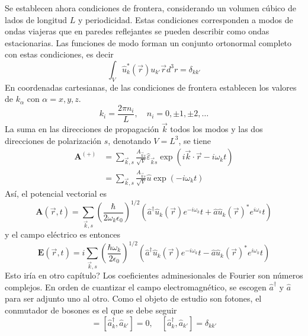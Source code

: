   Se establecen ahora condiciones de frontera, considerando un volumen cúbico de lados de longitud $L$ y periodicidad. Estas condiciones corresponden a modos de ondas viajeras que en paredes reflejantes se pueden describir como ondas estacionarias. Las funciones de modo forman un conjunto ortonormal completo con estas condiciones, es decir
  \begin{equation*}
    \int_V \hat{u}_k^{*}(\vec{r}) u_{k'} \vec{r} d^3 r = \delta_{kk'}
  \end{equation*}
  En coordenadas cartesianas, de las condiciones de frontera establecen los valores de $k_\alpha$ con $\alpha = x,y,z$.
  \begin{equation*}
    k_i = \frac{2\pi n_i}{L}, \quad n_i = 0, \pm1, \pm2, \dots
  \end{equation*}
  La suma en las direcciones de propagación $\vec{k}$ todos los modos y las dos direcciones de polarización $s$, denotando $V = L^3$, se tiene
  \begin{align*}
    \mathbf{A}^{(+)} & = \sum_{\vec{k}, s} \frac{A_{\vec{k}s}}{\sqrt{V}} \hat{\varepsilon}_{\vec{k}s} \exp{ \left( i\vec{k}\cdot\vec{r} - i \omega_k t \right) } \\
                     & = \sum_{\vec{k},s} \frac{A_{\vec{k}s}}{\sqrt{V}} \hat{u} \exp{\left( - i \omega_k t \right)}
  \end{align*}
  Así, el potencial vectorial es
  \begin{equation*}
    \mathbf{A}(\vec{r}, t) = \sum_{\vec{k}, s} \left( \frac{\hbar}{2\omega_k \epsilon_0} \right)^{1/2} \left( \hat{a}^{\dagger} \hat{u}_k(\vec{r}) e^{-i\omega_k} t + \hat{a} \hat{u}_k(\vec{r})^{*} e^{i\omega_k} t \right)
  \end{equation*}
  y el campo eléctrico es entonces
  \begin{equation*}
    \mathbf{E}(\vec{r}, t) = i\sum_{\vec{k}, s} \left( \frac{\hbar\omega_k}{2\epsilon_0} \right)^{1/2} \left( \hat{a}^{\dagger} \hat{u}_k(\vec{r}) e^{-i\omega_k} t - \hat{a} \hat{u}_k(\vec{r})^{*} e^{i\omega_k} t \right)
  \end{equation*}
  Esto iría en otro capítulo?
  Los coeficientes adminesionales de Fourier son números complejos. En orden de cuantizar el campo electromagnético, se escogen $\hat{a}^{\dagger}$ y $\hat{a}$ para ser adjunto uno al otro. Como el objeto de estudio son fotones, el conmutador de bosones es el que se debe seguir
  \begin{equation*}
    [\hat{a}_k, \hat{a}^{\dagger}_{k'}] = [\hat{a}^{\dagger}_k, \hat{a}_{k'}] = 0, \quad [\hat{a}^{\dagger}_k, \hat{a}_{k'}] = \delta_{kk'}
  \end{equation*}
\fi
